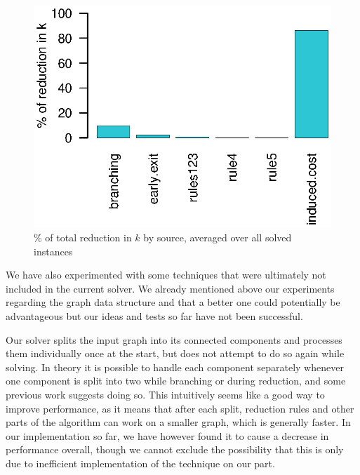 \documentclass[12pt,oneside,english,parskip=full,headings=small]{scrbook}
\newcommand{\todo}[1]{\paragraph{TODO} #1}
\theoremstyle{definition}
\begin{document}
\begin{figure}[h]
	\centering
	\includegraphics[scale=0.8]{interleaved_effectiveness}
	\caption{\% of total reduction in $k$ by source, averaged over all solved instances}
	\label{fig:interleaved_effectiveness}
\end{figure}



We have also experimented with some techniques that were ultimately not included in the current
solver. We already mentioned above our experiments regarding the graph data structure and that a
better one could potentially be advantageous but our ideas and tests so far have not been
successful.

Our solver splits the input graph into its connected components and processes them individually once
at the start, but does not attempt to do so again while solving. In theory it is possible to handle
each component separately whenever one component is split into two while branching or during
reduction, and some previous work suggests doing so. This intuitively seems like a good way to
improve performance, as it means that after each split, reduction rules and other parts of the
algorithm can work on a smaller graph, which is generally faster. In our implementation so far, we
have however found it to cause a decrease in performance overall, though we cannot exclude the
possibility that this is only due to inefficient implementation of the technique on our part.
\end{document}
